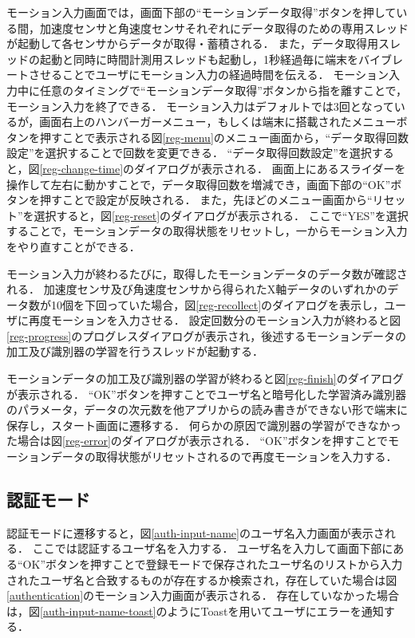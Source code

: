 モーション入力画面では，画面下部の``モーションデータ取得''ボタンを押している間，加速度センサと角速度センサそれぞれにデータ取得のための専用スレッドが起動して各センサからデータが取得・蓄積される．
また，データ取得用スレッドの起動と同時に時間計測用スレッドも起動し，1秒経過毎に端末をバイブレートさせることでユーザにモーション入力の経過時間を伝える．
モーション入力中に任意のタイミングで``モーションデータ取得''ボタンから指を離すことで，モーション入力を終了できる．
モーション入力はデフォルトでは3回となっているが，画面右上のハンバーガーメニュー，もしくは端末に搭載されたメニューボタンを押すことで表示される図\ref{reg-menu}のメニュー画面から，``データ取得回数設定''を選択することで回数を変更できる．
``データ取得回数設定''を選択すると，図\ref{reg-change-time}のダイアログが表示される．
画面上にあるスライダーを操作して左右に動かすことで，データ取得回数を増減でき，画面下部の``OK''ボタンを押すことで設定が反映される．
また，先ほどのメニュー画面から``リセット''を選択すると，図\ref{reg-reset}のダイアログが表示される．
ここで``YES''を選択することで，モーションデータの取得状態をリセットし，一からモーション入力をやり直すことができる．

モーション入力が終わるたびに，取得したモーションデータのデータ数が確認される．
加速度センサ及び角速度センサから得られたX軸データのいずれかのデータ数が10個を下回っていた場合，図\ref{reg-recollect}のダイアログを表示し，ユーザに再度モーションを入力させる．
設定回数分のモーション入力が終わると図\ref{reg-progress}のプログレスダイアログが表示され，後述するモーションデータの加工及び識別器の学習を行うスレッドが起動する．

モーションデータの加工及び識別器の学習が終わると図\ref{reg-finish}のダイアログが表示される．
``OK''ボタンを押すことでユーザ名と暗号化した学習済み識別器のパラメータ，データの次元数を他アプリからの読み書きができない形で端末に保存し，スタート画面に遷移する．
何らかの原因で識別器の学習ができなかった場合は図\ref{reg-error}のダイアログが表示される．
``OK''ボタンを押すことでモーションデータの取得状態がリセットされるので再度モーションを入力する．

\subsection{認証モード}
認証モードに遷移すると，図\ref{auth-input-name}のユーザ名入力画面が表示される．
ここでは認証するユーザ名を入力する．
ユーザ名を入力して画面下部にある``OK''ボタンを押すことで登録モードで保存されたユーザ名のリストから入力されたユーザ名と合致するものが存在するか検索され，存在していた場合は図\ref{authentication}のモーション入力画面が表示される．
存在していなかった場合は，図\ref{auth-input-name-toast}のようにToastを用いてユーザにエラーを通知する．

